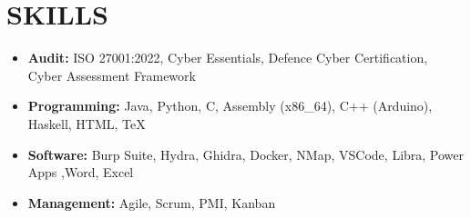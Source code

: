 \section*{SKILLS}
\begin{itemize}
    \item \textbf{Audit:} ISO 27001:2022, Cyber Essentials, Defence Cyber Certification, Cyber Assessment Framework
    \item \textbf{Programming:} Java, Python, C, Assembly (x86\_64), C++ (Arduino), Haskell, HTML, \TeX{}
    \item \textbf{Software:} Burp Suite, Hydra, Ghidra, Docker, NMap, VSCode, Libra, Power Apps ,Word, Excel
    \item \textbf{Management:} Agile, Scrum, PMI, Kanban
\end{itemize}